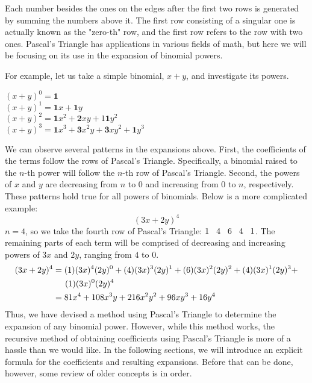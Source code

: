 \documentclass[11pt]{article}
\begin{document}
Each number besides the ones on the edges after the first two rows is generated by summing the numbers above it. The first row consisting of a singular one is actually known as the "zero-th" row, and the first row refers to the row with two ones. Pascal's Triangle has applications in various fields of math, but here we will be focusing on its use in the expansion of binomial powers.

For example, let us take a simple binomial, $x+y$, and investigate its powers. 

\begin{center}
$(x+y)^0 = \textbf{1}$\\
$(x+y)^1 = \textbf{1}x+\textbf{1}y$\\
$(x+y)^2 = \textbf{1}x^2+\textbf{2}xy+1\textbf{1}y^2$\\
$(x+y)^3 = \textbf{1}x^3+\textbf{3}x^2y+\textbf{3}xy^2+\textbf{1}y^3$
\end{center}

We can observe several patterns in the expansions above. First, the coefficients of the terms follow the rows of Pascal's Triangle. Specifically, a binomial raised to the $n$-th power will follow the $n$-th row of Pascal's Triangle. Second, the powers of $x$ and $y$ are decreasing from $n$ to $0$ and increasing from $0$ to $n$, respectively. These patterns hold true for all powers of binomials. Below is a more complicated example:
\[(3x+2y)^4\]
$n=4$, so we take the fourth row of Pascal's Triangle: $1\hspace{0.3 cm}4\hspace{0.3 cm}6\hspace{0.3 cm}4\hspace{0.3 cm}1$. The remaining parts of each term will be comprised of decreasing and increasing powers of $3x$ and $2y$, ranging from $4$ to $0$.
\begin{align*}
    (3x+2y)^4&=(1)(3x)^4(2y)^0+(4)(3x)^3(2y)^1+(6)(3x)^2(2y)^2+(4)(3x)^1(2y)^3+\\&\hspace{0.5 cm}(1)(3x)^0(2y)^4\\
    &=81x^4+108x^3y+216x^2y^2+96xy^3+16y^4
\end{align*}
Thus, we have devised a method using Pascal's Triangle to determine the expansion of any binomial power. However, while this method works, the recursive method of obtaining coefficients using Pascal's Triangle is more of a hassle than we would like. In the following sections, we will introduce an explicit formula for the coefficients and resulting expansions. Before that can be done, however, some review of older concepts is in order.
\end{document}
